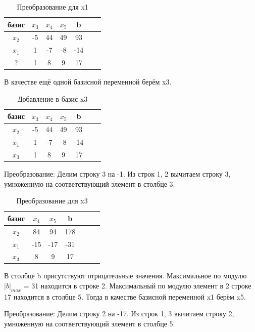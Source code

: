 \documentclass{article}
\begin{document}
\begin{table}[H]
    \centering
    \caption{Преобразование для x1}
    \begin{tabular}{|c|c|c|c|c|c|c|}
    \hline
        базис  & $x_3$ & $x_4$ & $x_5$ & b \\ \hline
        $x_2$	&	-5	&44&	49&	93 \\
        $x_1$ &	1	&-7	&-8	&-14 \\
        $?$  		&1&	8	&9	&17 \\ \hline
    \end{tabular}
\end{table}

В качестве ещё одной базисной переменной берём x3.
\begin{table}[H]
    \centering
    \caption{Добавление в базис x3}
    \begin{tabular}{|c|c|c|c|c|c|c|}
    \hline
    базис  & $x_3$ & $x_4$ & $x_5$ & b \\ \hline
    $x_2$	&	-5	&44&	49&	93 \\
    $x_1$ &	1	&-7	&-8	&-14 \\
    $x_3$  		&1&	8	&9	&17 \\ \hline
    \end{tabular}
\end{table}

Преобразование: Делим строку 3 на -1. Из строк 1, 2 вычитаем строку 3, умноженную на соответствующий элемент в столбце 3.

\begin{table}[H]
    \centering
    \caption{Преобразование для x3}
    \begin{tabular}{|c|c|c|c|c|c|c|}
    \hline
        базис  & $x_4$ & $x_5$ & b \\ \hline
        $x_2$ 	&84&	94	&178 \\
        $x_1$ 	&-15	&-17&	-31 \\
        $x_3$  	&8	&9	&17 \\ \hline
    \end{tabular}
\end{table}

В столбце b присутствуют отрицательные значения. Максимальное по модулю $|b|_{max}$ = 31 находится в строке 2. 
Максимальный по модулю элемент в 2 строке 17 находится в столбце 5. 
Тогда в качестве базисной переменной x1 берём x5.

Преобразование: Делим строку 2 на -17. Из строк 1, 3 вычитаем строку 2, умноженную на соответствующий элемент в столбце 5.
\end{document}
